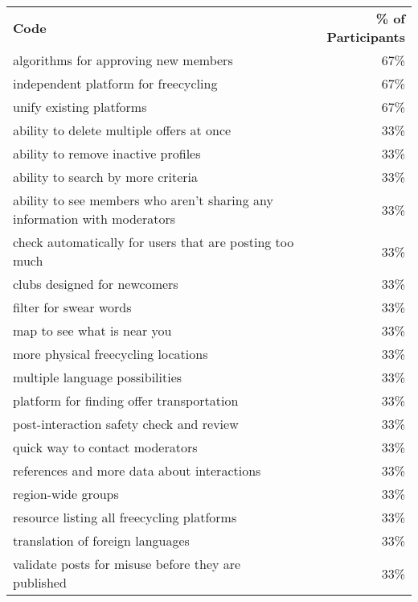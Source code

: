 \begin{longtable}{p{}r}
\textbf{Code}                                                             & \textbf{\% of Participants} \\
algorithms for approving new members                                      & 67\%                        \\
independent platform for freecycling                                      & 67\%                        \\
unify existing platforms                                                  & 67\%                        \\
ability to delete multiple offers at once                                 & 33\%                        \\
ability to remove inactive profiles                                       & 33\%                        \\
ability to search by more criteria                                        & 33\%                        \\
ability to see members who aren't sharing any information with moderators & 33\%                        \\
check automatically for users that are posting too much                   & 33\%                        \\
clubs designed for newcomers                                              & 33\%                        \\
filter for swear words                                                    & 33\%                        \\
map to see what is near you                                               & 33\%                        \\
more physical freecycling locations                                       & 33\%                        \\
multiple language possibilities                                           & 33\%                        \\
platform for finding offer transportation                                 & 33\%                        \\
post-interaction safety check and review                                  & 33\%                        \\
quick way to contact moderators                                           & 33\%                        \\
references and more data about interactions                               & 33\%                        \\
region-wide groups                                                        & 33\%                        \\
resource listing all freecycling platforms                                & 33\%                        \\
translation of foreign languages                                          & 33\%                        \\
validate posts for misuse before they are published                       & 33\%
\end{longtable}
